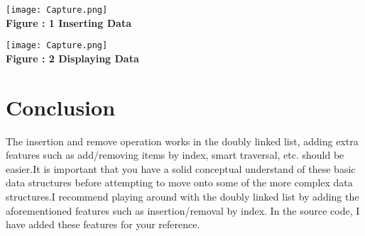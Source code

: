 \documentclass[11pt]{article}            %
\begin{document}
\begin{center}
 \texttt{[image: Capture.png]}\\ 
\textbf{Figure : 1 Inserting Data}
\vskip 0.5cm
\end{center}

\begin{center}
 \texttt{[image: Capture.png]}\\ 
\textbf{Figure : 2 Displaying Data}
\vskip 0.5cm
\end{center}

\section{Conclusion}  
The insertion and remove operation works in the doubly linked list, adding extra features such as  add/removing items by index, smart traversal, etc. should be easier.It is important that you have a solid conceptual understand of these basic data structures before attempting to move onto some of the more complex data structures.I recommend playing around with the doubly linked list by adding the aforementioned features such as insertion/removal by index. In the source code, I have added these features for your reference.

 
\end{document}
